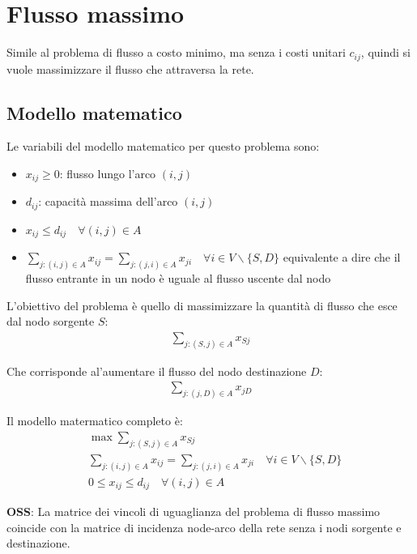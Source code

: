 \section{Flusso massimo}

Simile al problema di flusso a costo minimo, ma senza i costi unitari $c_{ij}$,
quindi si vuole massimizzare il flusso che attraversa la rete.

\subsection{Modello matematico}
Le variabili del modello matematico per questo problema sono:
\begin{itemize}
	\item $x_{ij} \geq 0$: flusso lungo l'arco $(i, j)$
	\item $d_{ij}$: capacità massima dell'arco $(i, j)$
	\item $x_{ij} \leq d_{ij} \quad \forall (i, j) \in A$
	\item $\sum_{j: (i, j) \in A} x_{ij} = \sum_{j: (j, i) \in A} x_{ji} \quad \forall i \in V \backslash \{S, D\}$ equivalente a dire che il flusso entrante in un nodo è uguale al flusso uscente dal nodo
\end{itemize}


L'obiettivo del problema è quello di massimizzare la quantità di flusso che esce dal nodo sorgente $S$:
\begin{align}
	\sum_{j: (S, j) \in A} x_{Sj}
\end{align}

Che corrisponde al'aumentare il flusso del nodo destinazione $D$:
\begin{align}
	\sum_{j: (j, D) \in A} x_{jD}
\end{align}


Il modello matermatico completo è:
\begin{align}
	 & \max \sum_{j: (S, j) \in A} x_{Sj}                                                                      \\
	 & \sum_{j: (i, j) \in A} x_{ij} = \sum_{j: (j, i) \in A} x_{ji} \quad \forall i \in V \backslash \{S, D\} \\
	 & 0 \leq x_{ij} \leq d_{ij} \quad \forall (i, j) \in A
\end{align}

\textbf{OSS}: La matrice dei vincoli di uguaglianza del problema di flusso massimo coincide
con la matrice di incidenza node-arco della rete senza i nodi sorgente e destinazione.



